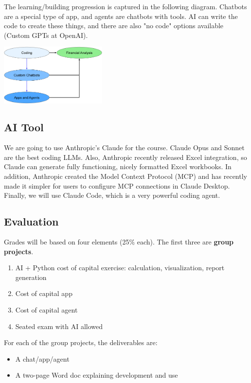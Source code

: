\documentclass[11pt]{article}
\begin{document}
The learning/building progression is captured in the following diagram. Chatbots are a special type of app, and agents are chatbots with tools.  AI can write the code to create these things, and there are also "no code" options available (Custom GPTs at OpenAI).

\begin{center}
\includegraphics[width=0.4\textwidth]{ai_progression2.png}
\end{center}

\subsection*{AI Tool}

We are going to use Anthropic's Claude for the course.  Claude Opus and Sonnet are the best coding LLMs.  Also, Anthropic recently released Excel integration, so Claude can generate fully functioning, nicely formatted Excel workbooks. In addition, Anthropic created the Model Context Protocol (MCP) and has recently made it simpler for users to configure MCP connections in Claude Desktop.  Finally, we will use Claude Code, which is a very powerful coding agent.

\subsection*{Evaluation}

Grades will be based on four elements (25\% each).  The first three are \textbf{group projects}.

\begin{enumerate}\setlength{\itemsep}{0pt}
\item AI + Python cost of capital exercise: calculation, visualization, report generation 
\item  Cost of capital app 
\item Cost of capital agent 
\item Seated exam with AI allowed 
\end{enumerate}
For each of the group projects, the deliverables are:
\begin{itemize}\setlength{\itemsep}{0pt}
\item A chat/app/agent
\item A two-page Word doc explaining development and use
\end{itemize}
\end{document}
